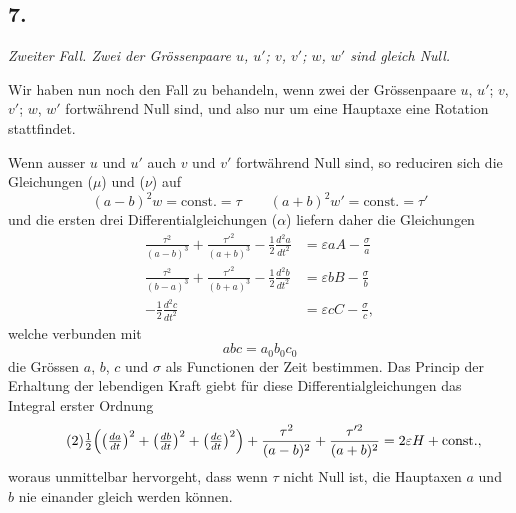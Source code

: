 \documentclass[12pt,a4paper]{book}
\theoremstyle{definition}
\theoremstyle{remark}
\begin{document}
\subsection*{7.}

\textit{Zweiter Fall. Zwei der Grössenpaare $u$, $u'$; $v$, $v'$; $w$, $w'$ sind gleich Null.}

Wir haben nun noch den Fall zu behandeln, wenn zwei der Grössenpaare $u$, $u'$; $v$, $v'$; $w$, $w'$ fortwährend Null sind, und also nur um eine Hauptaxe eine Rotation stattfindet.

Wenn ausser $u$ und $u'$ auch $v$ und $v'$ fortwährend Null sind, so reduciren sich die Gleichungen ($\mu$) und ($\nu$) auf
\[ (a-b)^2w = \text{const.} = \tau \qquad (a+b)^2w' = \text{const.} = \tau' \]
und die ersten drei Differentialgleichungen ($\alpha$) liefern daher die Gleichungen
\begin{equation}
\tag{1}
\begin{aligned}
\frac{\tau^2}{(a-b)^3} + \frac{\tau'^2}{(a+b)^3} - \tfrac{1}{2}\frac{d^2a}{dt^2} &= \varepsilon aA - \frac{\sigma}{a}\\
\frac{\tau^2}{(b-a)^3} + \frac{\tau'^2}{(b+a)^3} - \tfrac{1}{2}\frac{d^2b}{dt^2} &= \varepsilon bB - \frac{\sigma}{b}\\
-\tfrac{1}{2}\frac{d^2c}{dt^2} &= \varepsilon cC - \frac{\sigma}{c},
\end{aligned}
\end{equation}
welche verbunden mit
\[ abc = a_0b_0c_0 \]
die Grössen $a$, $b$, $c$ und $\sigma$ als Functionen der Zeit bestimmen. Das Princip der Erhaltung der lebendigen Kraft giebt für diese Differentialgleichungen das Integral erster Ordnung
\begin{equation}
\tag{2} \tfrac{1}{2}\Bigl(\bigl(\tfrac{da}{dt}\bigr)^2 + \bigl(\tfrac{db}{dt}\bigr)^2 + \bigl(\tfrac{dc}{dt}\bigr)^2\Bigr) + \frac{\tau^2}{(a-b)^2} + \frac{\tau'^2}{(a+b)^2} = 2\varepsilon H + \text{const.}, \end{equation}
woraus unmittelbar hervorgeht, dass wenn $\tau$ nicht Null ist, die Hauptaxen $a$ und $b$ nie einander gleich werden können.
\end{document}
